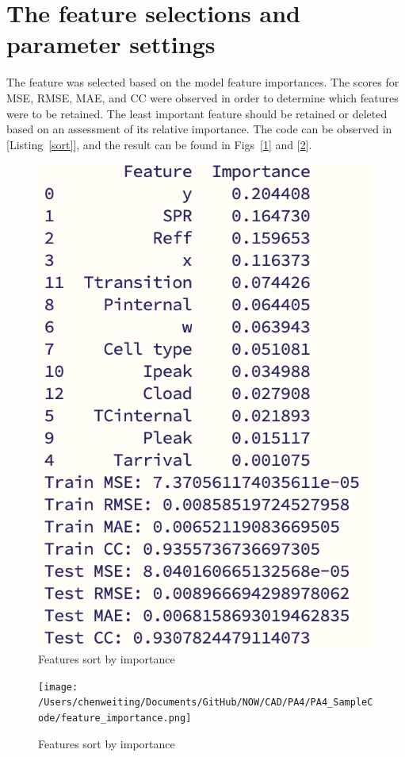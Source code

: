 \documentclass{article}
\begin{document}
\section{The feature selections and parameter settings}

The feature was selected based on the model feature importances. The scores for MSE, RMSE, MAE, and CC were observed in order to determine which features were to be retained. The least important feature should be retained or deleted based on an assessment of its relative importance. The code can be observed in [Listing~\ref{sort}], and the result can be found in Figs~[\ref{f1}] and [\ref{f2}].

\begin{figure}[H]
    \centering
\includegraphics*[width=0.4\linewidth]{./img/2024-06-13-22-29-38.png}
\caption{Features sort by importance}
\label{f1}
\end{figure}

\begin{figure}[H]
    \centering
\texttt{[image: /Users/chenweiting/Documents/GitHub/NOW/CAD/PA4/PA4\_SampleCode/feature\_importance.png]}
\caption{Features sort by importance}
\label{f2}
\end{figure}
\end{document}
